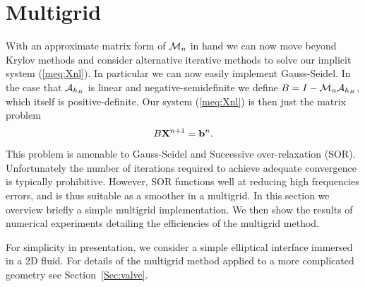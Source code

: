 \section{Multigrid}
\label{Sec:Multigrid}
With an approximate matrix form of $\mathcal{M}_n$ in hand we can now move beyond Krylov methods and consider alternative iterative methods to solve our implicit system (\ref{meq:Xnl}). In particular we can now easily implement Gauss-Seidel. In the case that $\mathcal{A}_{h_B}$ is linear and negative-semidefinite we define $B=I - \mathcal{M}_n\mathcal{A}_{h_B}$, which itself is positive-definite. Our system (\ref{meq:Xnl}) is then just the matrix problem
\begin{equation}
B\mathbf{X}^{n+1} = \mathbf{b}^n. \label{meq:MatrixProblem}
\end{equation}
This problem is amenable to Gauss-Seidel and Successive over-relaxation (SOR). Unfortunately the number of iterations required to achieve adequate convergence is typically prohibitive. However, SOR functions well at reducing high frequencies errors, and is thus suitable as a smoother in a multigrid. In this section we overview briefly a simple multigrid implementation. We then show the results of numerical experiments detailing the efficiencies of the multigrid method.

For simplicity in presentation, we consider a simple elliptical interface immersed in a 2D fluid. For details of the multigrid method applied to a more complicated geometry see Section~\ref{Sec:valve}.

